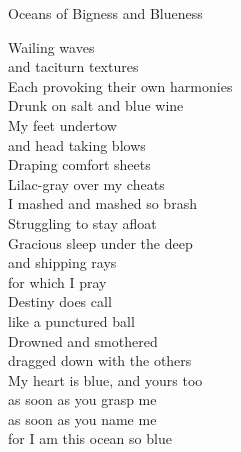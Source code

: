 Oceans of Bigness and Blueness

Wailing waves\\
and taciturn textures\\
Each provoking their own harmonies\\
Drunk on salt and blue wine\\
My feet undertow\\
and head taking blows\\
Draping comfort sheets\\
Lilac-gray over my cheats\\
I mashed and mashed so brash\\
Struggling to stay afloat\\
Gracious sleep under the deep\\
and shipping rays\\
for which I pray\\
Destiny does call\\
like a punctured ball\\
Drowned and smothered\\
dragged down with the others\\
My heart is blue, and yours too\\
as soon as you grasp me\\
as soon as you name me\\
for I am this ocean so blue\\



